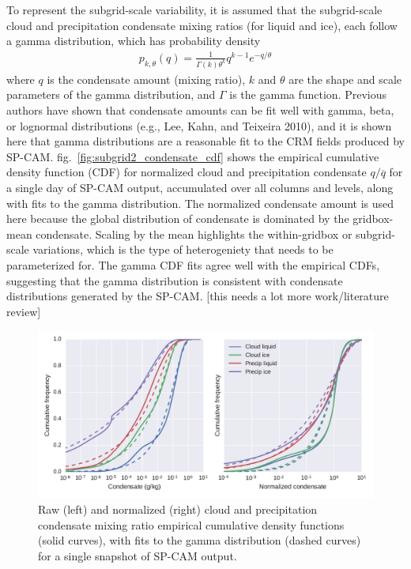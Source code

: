 To represent the subgrid-scale variability, it is assumed that the
subgrid-scale cloud and precipitation condensate mixing ratios (for
liquid and ice), each follow a gamma distribution, which has probability
density \[\begin{gathered}
    p_{k, \theta}(q) = \frac{1}{\Gamma(k) \theta^k} q^{k - 1} e^{-q/\theta}\end{gathered}\]
where \(q\) is the condensate amount (mixing ratio), \(k\) and
\(\theta\) are the shape and scale parameters of the gamma distribution,
and \(\Gamma\) is the gamma function. Previous authors have shown that
condensate amounts can be fit well with gamma, beta, or lognormal
distributions (e.g., Lee, Kahn, and Teixeira 2010), and it is shown here
that gamma distributions are a reasonable fit to the CRM fields produced
by SP-CAM. fig.~\ref{fig:subgrid2_condensate_cdf} shows the empirical
cumulative density function (CDF) for normalized cloud and precipitation
condensate \(q / \overline{q}\) for a single day of SP-CAM output,
accumulated over all columns and levels, along with fits to the gamma
distribution. The normalized condensate amount is used here because the
global distribution of condensate is dominated by the gridbox-mean
condensate. Scaling by the mean highlights the within-gridbox or
subgrid-scale variations, which is the type of heterogeniety that needs
to be parameterized for. The gamma CDF fits agree well with the
empirical CDFs, suggesting that the gamma distribution is consistent
with condensate distributions generated by the SP-CAM. {[}this needs a
lot more work/literature review{]}

\begin{figure}[htbp]
\centering
\includegraphics{graphics/subgrid2_mxratio_cdf1.pdf}
\caption{\label{fig:subgrid2_condensate_cdf}Raw (left) and normalized
(right) cloud and precipitation condensate mixing ratio empirical
cumulative density functions (solid curves), with fits to the gamma
distribution (dashed curves) for a single snapshot of SP-CAM
output.}\label{fig:subgrid2ux5fcondensateux5fcdf}
\end{figure}

